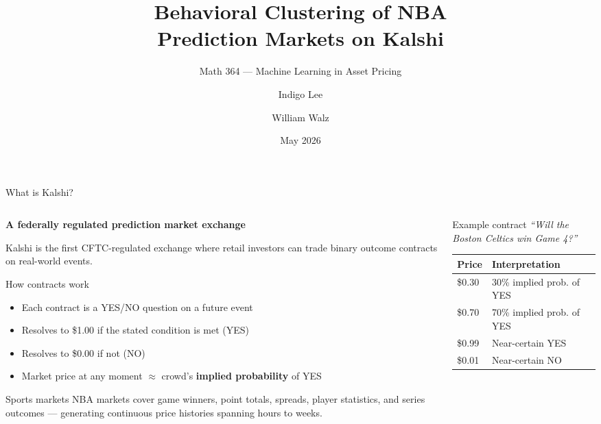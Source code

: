 \documentclass[10pt, aspectratio=169]{beamer}
\title{Behavioral Clustering of NBA\\Prediction Markets on Kalshi}
\subtitle{Math 364 — Machine Learning in Asset Pricing}
\author{Indigo Lee \and William Walz}
\institute{Claremont Graduate University}
\date{May 2026}
\begin{document}

\maketitle

\begin{frame}{What is Kalshi?}
  \begin{columns}[T]
    \begin{column}{0.55\textwidth}
      \textbf{A federally regulated prediction market exchange}

      \medskip
      Kalshi is the first CFTC-regulated exchange where retail investors
      can trade \alert{binary outcome contracts} on real-world events.

      \medskip
      \begin{block}{How contracts work}
        \begin{itemize}
          \item Each contract is a YES/NO question on a future event
          \item Resolves to \$1.00 if the stated condition is met (YES)
          \item Resolves to \$0.00 if not (NO)
          \item Market price at any moment $\approx$ crowd's
                \textbf{implied probability} of YES
        \end{itemize}
      \end{block}

      \medskip
      \begin{block}{Sports markets}
        NBA markets cover game winners, point totals, spreads,
        player statistics, and series outcomes --- generating
        continuous price histories spanning hours to weeks.
      \end{block}
    \end{column}
    \begin{column}{0.42\textwidth}
      \begin{block}{Example contract}
        \textit{``Will the Boston Celtics win Game 4?''}

        \smallskip
        \begin{tabular}{@{}ll@{}}
          \toprule
          Price & Interpretation \\
          \midrule
          \$0.30 & 30\% implied prob. of YES \\
          \$0.70 & 70\% implied prob. of YES \\
          \$0.99 & Near-certain YES \\
          \$0.01 & Near-certain NO \\
          \bottomrule
        \end{tabular}


\end{block}
\end{column}
\end{columns}
\end{frame}
\end{document}
